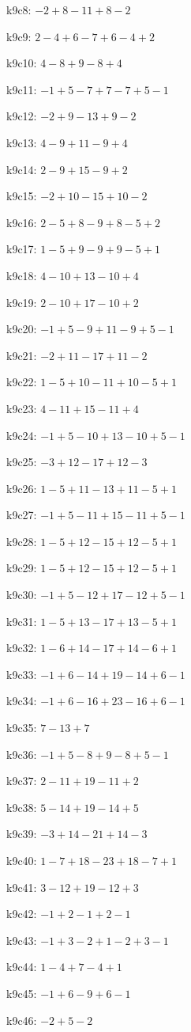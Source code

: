 k9c8: $ -2+8-11+8-2 $ 

k9c9: $ 2-4+6-7+6-4+2 $ 

k9c10: $ 4-8+9-8+4 $ 

k9c11: $ -1+5-7+7-7+5-1 $ 

k9c12: $ -2+9-13+9-2 $ 

k9c13: $ 4-9+11-9+4 $ 

k9c14: $ 2-9+15-9+2 $ 

k9c15: $ -2+10-15+10-2 $ 

k9c16: $ 2-5+8-9+8-5+2 $ 

k9c17: $ 1-5+9-9+9-5+1 $ 

k9c18: $ 4-10+13-10+4 $ 

k9c19: $ 2-10+17-10+2 $ 

k9c20: $ -1+5-9+11-9+5-1 $ 

k9c21: $ -2+11-17+11-2 $ 

k9c22: $ 1-5+10-11+10-5+1 $ 

k9c23: $ 4-11+15-11+4 $ 

k9c24: $ -1+5-10+13-10+5-1 $ 

k9c25: $ -3+12-17+12-3 $ 

k9c26: $ 1-5+11-13+11-5+1 $ 

k9c27: $ -1+5-11+15-11+5-1 $ 

k9c28: $ 1-5+12-15+12-5+1 $ 

k9c29: $ 1-5+12-15+12-5+1 $ 

k9c30: $ -1+5-12+17-12+5-1 $ 

k9c31: $ 1-5+13-17+13-5+1 $ 

k9c32: $ 1-6+14-17+14-6+1 $ 

k9c33: $ -1+6-14+19-14+6-1 $ 

k9c34: $ -1+6-16+23-16+6-1 $ 

k9c35: $ 7-13+7 $ 

k9c36: $ -1+5-8+9-8+5-1 $ 

k9c37: $ 2-11+19-11+2 $ 

k9c38: $ 5-14+19-14+5 $ 

k9c39: $ -3+14-21+14-3 $ 

k9c40: $ 1-7+18-23+18-7+1 $ 

k9c41: $ 3-12+19-12+3 $ 

k9c42: $ -1+2-1+2-1 $ 

k9c43: $ -1+3-2+1-2+3-1 $ 

k9c44: $ 1-4+7-4+1 $ 

k9c45: $ -1+6-9+6-1 $ 

k9c46: $ -2+5-2 $ 

